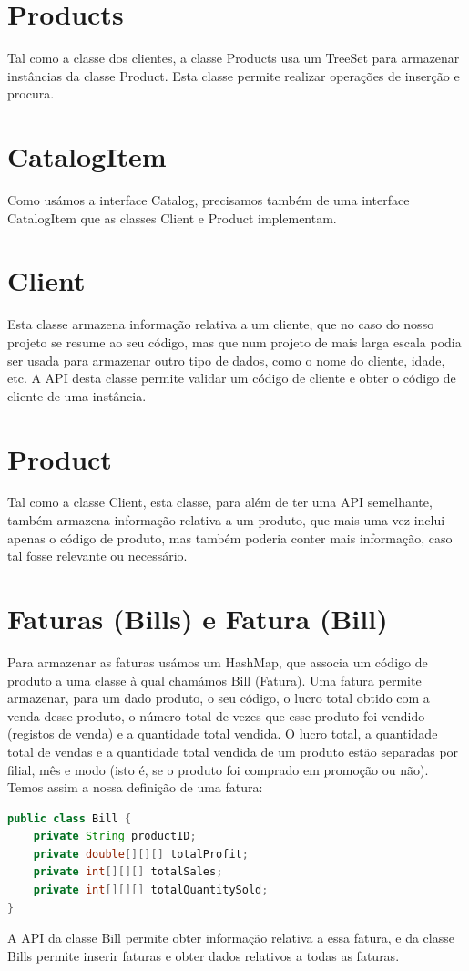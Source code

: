 \documentclass[a4paper]{report}
\begin{document}
	\section{Products}
	Tal como a classe dos clientes, a classe Products usa um TreeSet para armazenar instâncias da classe Product. Esta classe permite realizar operações de inserção e procura.
	
	\section{CatalogItem}
	Como usámos a interface Catalog, precisamos também de uma interface CatalogItem que as classes Client e Product implementam.
	
	\section{Client}
	Esta classe armazena informação relativa a um cliente, que no caso do nosso projeto se resume ao seu código, mas que num projeto de mais larga escala podia ser usada para armazenar outro tipo de dados, como o nome do cliente, idade, etc. A API desta classe permite validar um código de cliente e obter o código de cliente de uma instância.
	
	\section{Product}
	Tal como a classe Client, esta classe, para além de ter uma API semelhante, também armazena informação relativa a um produto, que mais uma vez inclui apenas o código de produto, mas também poderia conter mais informação, caso tal fosse relevante ou necessário.

	\section{Faturas (Bills) e Fatura (Bill)}
	Para armazenar as faturas usámos um HashMap, que associa um código de produto a uma classe à qual chamámos Bill (Fatura). Uma fatura permite armazenar, para um dado produto, o seu código, o lucro total obtido com a venda desse produto, o número total de vezes que esse produto foi vendido (registos de venda) e a quantidade total vendida. O lucro total, a quantidade total de vendas e a quantidade total vendida de um produto estão separadas por filial, mês e modo (isto é, se o produto foi comprado em promoção ou não). Temos assim a nossa definição de uma fatura:
	\begin{lstlisting}[language=Java]
public class Bill {
    private String productID;
    private double[][][] totalProfit;
    private int[][][] totalSales;
    private int[][][] totalQuantitySold;
}
	\end{lstlisting}
	A API da classe Bill permite obter informação relativa a essa fatura, e da classe Bills permite inserir faturas e obter dados relativos a todas as faturas.
\end{document}
